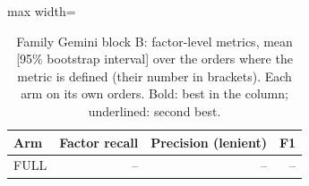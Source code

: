 \begin{table}[htbp]
\centering\footnotesize
\begin{adjustbox}{max width=\textwidth}
\begin{tabular}{@{}lrrr@{}}
\toprule
Arm & Factor recall & Precision (lenient) & F1 \\
\midrule
FULL & -- & -- & -- \\
\bottomrule
\end{tabular}
\end{adjustbox}
\caption{Family Gemini block B: factor-level metrics, mean [95\% bootstrap interval] over the orders where the metric is defined (their number in brackets). Each arm on its own orders. Bold: best in the column; underlined: second best.}
\label{tab:table1a_shravani_gem}
\end{table}